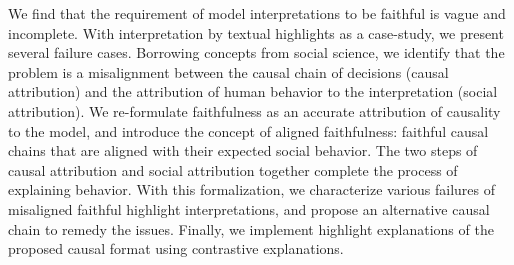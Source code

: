 We find that the requirement of model interpretations to be faithful is vague and incomplete. With interpretation by textual highlights as a case-study, we present several failure cases. Borrowing concepts from social science, we identify that the problem is a misalignment between the causal chain of decisions (causal attribution) and the attribution of human behavior to the interpretation (social attribution). We re-formulate faithfulness as an accurate attribution of causality to the model, and introduce the concept of aligned faithfulness: faithful causal chains that are aligned with their expected social behavior. The two steps of causal attribution and social attribution together complete the process of explaining behavior. With this formalization, we characterize various failures of misaligned faithful highlight interpretations, and propose an alternative causal chain to remedy the issues. Finally, we implement highlight explanations of the proposed causal format using contrastive explanations.